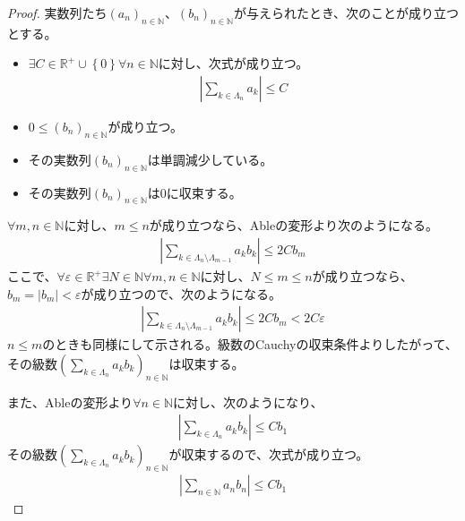 \documentclass[dvipdfmx]{jsarticle}
\begin{document}
\begin{proof}
実数列たち$\left( a_{n} \right)_{n \in \mathbb{N}}$、$\left( b_{n} \right)_{n \in \mathbb{N}}$が与えられたとき、次のことが成り立つとする。
\begin{itemize}
\item
  $\exists C \in \mathbb{R}^{+} \cup \left\{ 0 \right\}\forall n \in \mathbb{N}$に対し、次式が成り立つ。
\begin{align*}
\left| \sum_{k \in \varLambda_{n}} a_{k} \right| \leq C
\end{align*}
\item
  $0 \leq \left( b_{n} \right)_{n \in \mathbb{N}}$が成り立つ。
\item
  その実数列$\left( b_{n} \right)_{n \in \mathbb{N}}$は単調減少している。
\item
  その実数列$\left( b_{n} \right)_{n \in \mathbb{N}}$は$0$に収束する。
\end{itemize}
$\forall m,n \in \mathbb{N}$に対し、$m \leq n$が成り立つなら、Ableの変形より次のようになる。
\begin{align*}
\left| \sum_{k \in \varLambda_{n} \setminus \varLambda_{m - 1}} {a_{k}b_{k}} \right| \leq 2Cb_{m}
\end{align*}
ここで、$\forall\varepsilon \in \mathbb{R}^{+}\exists N \in \mathbb{N}\forall m,n \in \mathbb{N}$に対し、$N \leq m \leq n$が成り立つなら、$b_{m} = \left| b_{m} \right| < \varepsilon$が成り立つので、次のようになる。
\begin{align*}
\left| \sum_{k \in \varLambda_{n} \setminus \varLambda_{m - 1}} {a_{k}b_{k}} \right| \leq 2Cb_{m} < 2C\varepsilon
\end{align*}
$n \leq m$のときも同様にして示される。級数のCauchyの収束条件よりしたがって、その級数$\left( \sum_{k \in \varLambda_{n}} {a_{k}b_{k}} \right)_{n \in \mathbb{N}}$は収束する。\par
また、Ableの変形より$\forall n \in \mathbb{N}$に対し、次のようになり、
\begin{align*}
\left| \sum_{k \in \varLambda_{n}} {a_{k}b_{k}} \right| \leq Cb_{1}
\end{align*}
その級数$\left( \sum_{k \in \varLambda_{n}} {a_{k}b_{k}} \right)_{n \in \mathbb{N}}$が収束するので、次式が成り立つ。
\begin{align*}
\left| \sum_{n \in \mathbb{N}} {a_{n}b_{n}} \right| \leq Cb_{1}
\end{align*}
\end{proof}
\end{document}
